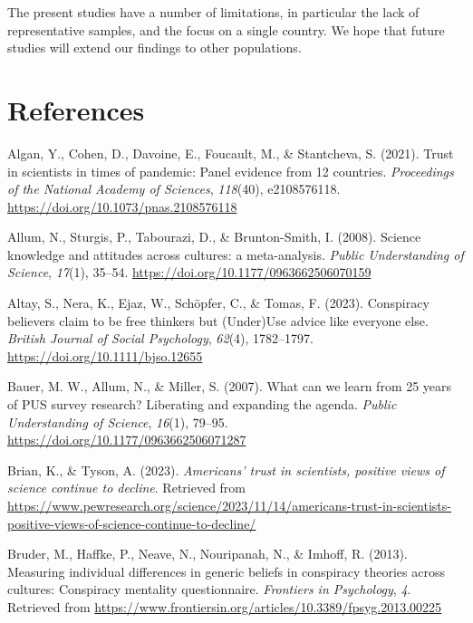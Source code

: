 \documentclass[
  doc,floatsintext]{apa6}
\newlength{\cslhangindent}
\newenvironment{CSLReferences}[2] %
 {\begin{list}{}{%
  \setlength{\itemindent}{0pt}
  \setlength{\leftmargin}{0pt}
  \setlength{\parsep}{0pt}
  \ifodd #1
   \setlength{\leftmargin}{\cslhangindent}
   \setlength{\itemindent}{-1\cslhangindent}
  \fi
  \setlength{\itemsep}{#2\baselineskip}}}
 {\end{list}}
\begin{document}
The present studies have a number of limitations, in particular the lack of representative samples, and the focus on a single country. We hope that future studies will extend our findings to other populations.

\FloatBarrier

\section{References}\label{references}

\label{refs}
\begin{CSLReferences}{1}{0}
Algan, Y., Cohen, D., Davoine, E., Foucault, M., \& Stantcheva, S. (2021). Trust in scientists in times of pandemic: Panel evidence from 12 countries. \emph{Proceedings of the National Academy of Sciences}, \emph{118}(40), e2108576118. \url{https://doi.org/10.1073/pnas.2108576118}

Allum, N., Sturgis, P., Tabourazi, D., \& Brunton-Smith, I. (2008). Science knowledge and attitudes across cultures: a meta-analysis. \emph{Public Understanding of Science}, \emph{17}(1), 35--54. \url{https://doi.org/10.1177/0963662506070159}

Altay, S., Nera, K., Ejaz, W., Schöpfer, C., \& Tomas, F. (2023). Conspiracy believers claim to be free thinkers but (Under)Use advice like everyone else. \emph{British Journal of Social Psychology}, \emph{62}(4), 1782--1797. \url{https://doi.org/10.1111/bjso.12655}

Bauer, M. W., Allum, N., \& Miller, S. (2007). What can we learn from 25 years of PUS survey research? Liberating and expanding the agenda. \emph{Public Understanding of Science}, \emph{16}(1), 79--95. \url{https://doi.org/10.1177/0963662506071287}

Brian, K., \& Tyson, A. (2023). \emph{Americans{'} trust in scientists, positive views of science continue to decline}. Retrieved from \url{https://www.pewresearch.org/science/2023/11/14/americans-trust-in-scientists-positive-views-of-science-continue-to-decline/}

Bruder, M., Haffke, P., Neave, N., Nouripanah, N., \& Imhoff, R. (2013). Measuring individual differences in generic beliefs in conspiracy theories across cultures: Conspiracy mentality questionnaire. \emph{Frontiers in Psychology}, \emph{4}. Retrieved from \url{https://www.frontiersin.org/articles/10.3389/fpsyg.2013.00225}


\end{CSLReferences}
\end{document}
